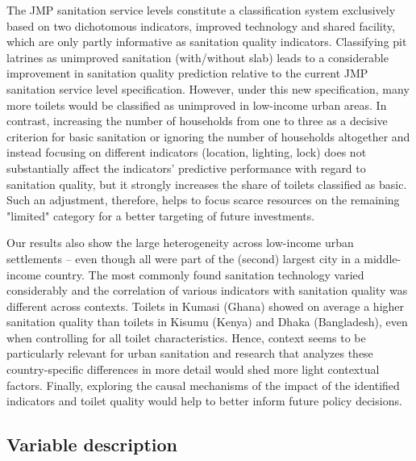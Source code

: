 \documentclass[natbib]{svjour3}                     %
\begin{document}
The JMP sanitation service levels constitute a classification system exclusively based on two dichotomous indicators, improved technology and shared facility, which are only partly informative as sanitation quality indicators. Classifying pit latrines as unimproved sanitation (with/without slab) leads to a considerable improvement in sanitation quality prediction relative to the current JMP sanitation service level specification. However, under this new specification, many more toilets would be classified as unimproved in low-income urban areas. In contrast, increasing the number of households from one to three as a decisive criterion for basic sanitation or ignoring the number of households altogether and instead focusing on different indicators (location, lighting, lock) does not substantially affect the indicators’ predictive performance with regard to sanitation quality, but it strongly increases the share of toilets classified as basic. Such an adjustment, therefore, helps to focus scarce resources on the remaining "limited" category for a better targeting of future investments. 

Our results also show the large heterogeneity across low-income urban settlements -- even though all were part of the (second) largest city in a middle-income country. The most commonly found sanitation technology varied considerably and the correlation of various indicators with sanitation quality was different across contexts. Toilets in Kumasi (Ghana) showed on average a higher sanitation quality than toilets in Kisumu (Kenya) and Dhaka (Bangladesh), even when controlling for all toilet characteristics. Hence, context seems to be particularly relevant for urban sanitation and research that analyzes these country-specific differences in more detail would shed more light contextual factors. Finally, exploring the causal mechanisms of the impact of the identified indicators and toilet quality would help to better inform future policy decisions. 


\clearpage



\clearpage
\appendix
\begin{landscape}
\section{Variable description}
\label{sec:variables}



\end{landscape}
\end{document}
